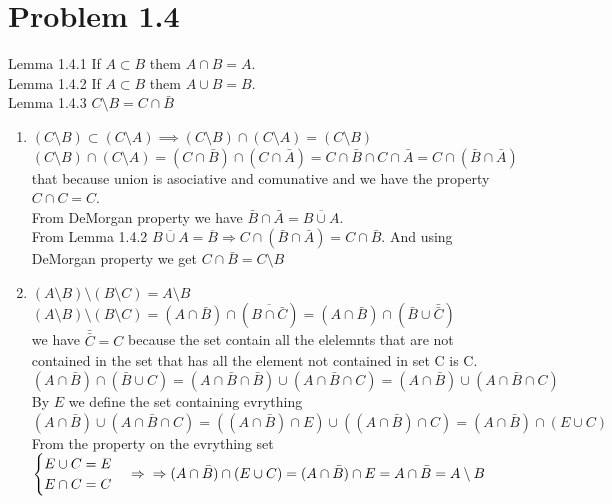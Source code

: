 \documentclass[12pt]{article}
\begin{document}
\newpage


\section*{Problem 1.4}
Lemma 1.4.1 If $A \subset B$ them $A\cap B = A$.\\ 
Lemma 1.4.2 If $A \subset B$ them $A\cup B = B$.\\ 
Lemma 1.4.3
$C\setminus B = C \cap \bar{B}$\\
\begin{enumerate}[label=\alph*)]
\item
$ (C\setminus B) \subset (C\setminus A ) \implies  (C\setminus B ) \cap  (C\setminus A )=  (C\setminus B )$\\
$(C\setminus B ) \cap  (C\setminus A ) = (C\cap \bar{B} ) \cap  (C \cap \bar{A} ) = C\cap \bar{B} \cap  C \cap \bar{A} = C\cap (\bar{B} \cap \bar{A})$ \\
that because union is asociative and comunative and we have the property $C\cap C = C$.\\
From DeMorgan property we have $\bar{B} \cap \bar {A}=\overline{B\cup A}$. \\From Lemma 1.4.2  $\overline{B\cup A} =  \overline{B} \Rightarrow C\cap (\bar{B} \cap \bar{A})= C \cap \bar{B}$.
 And using DeMorgan property we get $C \cap \bar{B} = C\setminus B$

 \item $(A\setminus B)\setminus(B\setminus C)= A \setminus B$ \\
 $(A\setminus B)\setminus(B\setminus C) = (A\cap \bar{B})\cap(\overline{B\cap \bar{C}})= (A\cap \bar{B})\cap({\bar{B}\cup \bar{\bar{C}}})$\\
 we have $\bar{\bar{C}} = C$ because the set contain all the elelemnts that are not contained in the set that has all the element not contained in set C is C.\\
 $(A\cap \bar{B})\cap(\bar{B}\cup C)= (A\cap \bar{B}\cap\bar{B})\cup (A\cap \bar{B}\cap C) = (A\cap \bar{B})\cup (A\cap \bar{B}\cap C) $ \\
 By $E$ we define the set containing evrything\\
$(A\cap \bar{B})\cup (A\cap \bar{B}\cap C) = ((A\cap \bar{B}) \cap E)\cup ((A\cap \bar{B})\cap C) = (A\cap \bar{B}) \cap (E \cup C)$\\
From the property on the evrything set $
\begin{cases}
  E \cup C = E \\
  E \cap C = C
\end{cases} \Rightarrow \\ \Rightarrow (A\cap \bar{B}) \cap (E \cup C) = (A \cap \bar{B})\cap E =A \cap \bar{B} = A \setminus B$


\end{enumerate}
\end{document}
